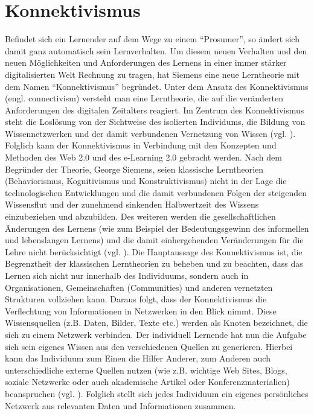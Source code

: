 \section{Konnektivismus}
Befindet sich ein Lernender auf dem Wege zu einem "`Prosumer"', so ändert sich damit ganz automatisch sein Lernverhalten. Um diesem neuen Verhalten und den neuen Möglichkeiten und Anforderungen des Lernens in einer immer stärker digitalisierten Welt Rechnung zu tragen, hat Siemens eine neue Lerntheorie mit dem Namen "`Konnektivismus"' begründet. Unter dem Ansatz des Konnektivismus (engl. connectivism) versteht man eine Lerntheorie, die auf die veränderten Anforderungen des digitalen Zeitalters reagiert. Im Zentrum des Konnektivismus steht die Loslösung von der Sichtweise des isolierten Individums, die Bildung von Wissennetzwerken und der damit verbundenen Vernetzung von Wissen (vgl. \cite{Siemens2004}). Folglich kann der Konnektivismus in Verbindung mit den Konzepten und Methoden des Web 2.0 und des e-Learning 2.0 gebracht werden.
Nach dem Begründer der Theorie, George Siemens, seien klassische Lerntheorien (Behaviorismus, Kognitivismus und Konstruktivismus) nicht in der Lage die technologischen Entwicklungen und die damit verbundenen Folgen der steigenden Wissensflut und der zunehmend sinkenden Halbwertzeit des Wissens einzubeziehen und abzubilden. Des weiteren werden die gesellschaftlichen Änderungen des Lernens (wie zum Beispiel der Bedeutungsgewinn des informellen und lebenslangen Lernens) und die damit einhergehenden Veränderungen für die Lehre nicht berücksichtigt (vgl. \cite{Siemens2004}).
Die Hauptaussage des Konnektivismus ist, die Begrenztheit der klassischen Lerntheorien zu beheben und zu beachten, dass das Lernen sich nicht nur innerhalb des Individuums, sondern auch in Organisationen, Gemeinschaften (Communities) und anderen vernetzten Strukturen vollziehen kann. Daraus folgt, dass der Konnektivismus die Verflechtung von Informationen in Netzwerken in den Blick nimmt. Diese Wissensquellen (z.B. Daten, Bilder, Texte etc.) werden als Knoten bezeichnet, die sich zu einem Netzwerk verbinden. Der individuell Lernende hat nun die Aufgabe sich sein eigenes Wissen aus den verschiedenen Quellen zu generieren. Hierbei kann das Individuum zum Einen die Hilfer Anderer, zum Anderen auch unterschiedliche externe Quellen nutzen (wie z.B. wichtige Web Sites, Blogs, soziale Netzwerke oder auch akademische Artikel oder Konferenzmaterialien) beanspruchen (vgl. \cite{Siemens2004}). Folglich stellt sich jedes Individuum ein eigenes persönliches Netzwerk aus relevanten Daten und Informationen zusammen. 

